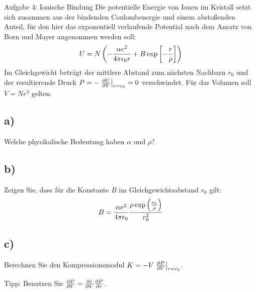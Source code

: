 \begin{aufgabe}{Aufgabe 4: Ionische Bindung}
    Die potentielle Energie von Ionen im Kristall setzt sich zusammen aus der bindenden Coulombenergie und einem abstoßenden Anteil,
    für den hier das exponentiell verlaufende Potential nach dem Ansatz von Born und Mayer angenommen werden soll:
    \[
        U = N \left(-\frac{\alpha e^2}{4\pi\epsilon_0r} + B\exp\left[-\frac{r}{\rho}\right]\right)
    \]
    Im Gleichgewicht beträgt der mittlere Abstand zum nächsten Nachbarn $r_0$ und der resultierende Druck $P = - \left.\frac{\partial U}{\partial V}\right\rvert_{r=r_0} = 0$ verschwindet.
    Für das Volumen soll $V = Nr^3$ gelten.

    \subsection{a)}
    Welche physikalische Bedeutung haben $\alpha$ und $\rho$?

    \subsection{b)}
    Zeigen Sie, dass für die Konstante $B$ im Gleichgewichtsabstand $r_0$ gilt:
    \[
        B = \frac{\alpha e^2}{4\pi\epsilon_0} \frac{\rho\exp\left(\frac{r_0}{\rho}\right)}{r_0^2}
    \]

    \subsection{c)}
    Berechnen Sie den Kompressionsmodul $K = -V \left.\frac{\partial P}{\partial V}\right\rvert_{r=r_0}$.

    Tipp: Benutzen Sie $\frac{\partial P}{\partial V} = \frac{\partial r}{\partial V}\frac{\partial P}{\partial r}$.
\end{aufgabe}


